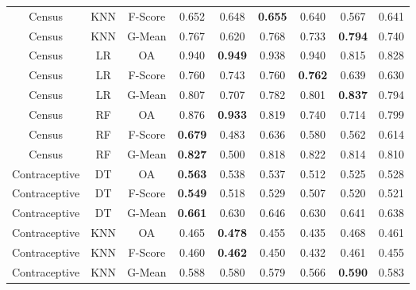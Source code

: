 \begin{longtable}{ccccccccc}
            Census &        KNN & F-Score &          0.652 &          0.648 & \textbf{0.655} &          0.640 &          0.567 &          0.641 \\
            Census &        KNN &  G-Mean &          0.767 &          0.620 &          0.768 &          0.733 & \textbf{0.794} &          0.740 \\
            Census &         LR &      OA &          0.940 & \textbf{0.949} &          0.938 &          0.940 &          0.815 &          0.828 \\
            Census &         LR & F-Score &          0.760 &          0.743 &          0.760 & \textbf{0.762} &          0.639 &          0.630 \\
            Census &         LR &  G-Mean &          0.807 &          0.707 &          0.782 &          0.801 & \textbf{0.837} &          0.794 \\
            Census &         RF &      OA &          0.876 & \textbf{0.933} &          0.819 &          0.740 &          0.714 &          0.799 \\
            Census &         RF & F-Score & \textbf{0.679} &          0.483 &          0.636 &          0.580 &          0.562 &          0.614 \\
            Census &         RF &  G-Mean & \textbf{0.827} &          0.500 &          0.818 &          0.822 &          0.814 &          0.810 \\
     Contraceptive &         DT &      OA & \textbf{0.563} &          0.538 &          0.537 &          0.512 &          0.525 &          0.528 \\
     Contraceptive &         DT & F-Score & \textbf{0.549} &          0.518 &          0.529 &          0.507 &          0.520 &          0.521 \\
     Contraceptive &         DT &  G-Mean & \textbf{0.661} &          0.630 &          0.646 &          0.630 &          0.641 &          0.638 \\
     Contraceptive &        KNN &      OA &          0.465 & \textbf{0.478} &          0.455 &          0.435 &          0.468 &          0.461 \\
     Contraceptive &        KNN & F-Score &          0.460 & \textbf{0.462} &          0.450 &          0.432 &          0.461 &          0.455 \\
     Contraceptive &        KNN &  G-Mean &          0.588 &          0.580 &          0.579 &          0.566 & \textbf{0.590} &          0.583 \\

\end{longtable}
